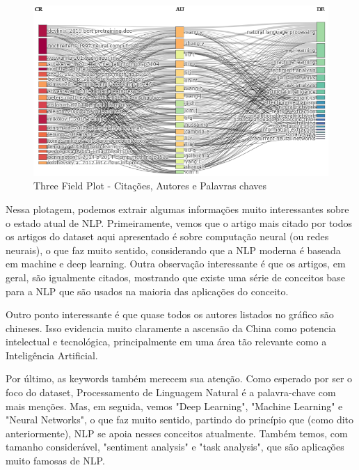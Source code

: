  \begin{figure}
    \centering
    \includegraphics[width=1\textwidth]{experiments/ABMHub/PesquisaBibliometrica/NLP/tfp1.png}
    \caption{Three Field Plot - Citações, Autores e Palavras chaves}
    \label{fig:ABMHub:TFP1}
\end{figure}

Nessa plotagem, podemos extrair algumas informações muito interessantes sobre o estado atual de NLP. Primeiramente, vemos que o artigo mais citado por todos os artigos do dataset aqui apresentado é sobre computação neural (ou redes neurais), o que faz muito sentido, considerando que a NLP moderna é baseada em machine e deep learning. Outra observação interessante é que os artigos, em geral, são igualmente citados, mostrando que existe uma série de conceitos base para a NLP que são usados na maioria das aplicações do conceito.

Outro ponto interessante é que quase todos os autores listados no gráfico são chineses. Isso evidencia muito claramente a ascensão da China como potencia intelectual e tecnológica, principalmente em uma área tão relevante como a Inteligência Artificial.

Por último, as keywords também merecem sua atenção. Como esperado por ser o foco do dataset, Processamento de Linguagem Natural é a palavra-chave com mais menções. Mas, em seguida, vemos "Deep Learning", "Machine Learning" e "Neural Networks", o que faz muito sentido, partindo do princípio que (como dito anteriormente), NLP se apoia nesses conceitos atualmente. Também temos, com tamanho considerável, "sentiment analysis" e "task analysis", que são aplicações muito famosas de NLP.
